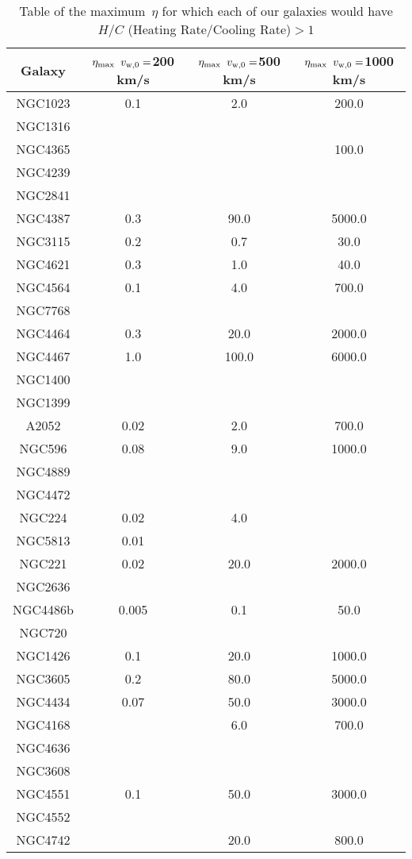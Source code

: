 \begin{table}
\caption{\label{tab:eta} Table of the maximum\
 $\eta$ for which each of our galaxies would have $H/C$ (Heating Rate/Cooling Rate)$>1$}
\begin{tabular}{cccc}
\hline
Galaxy & $\eta_{\rm max}$ $v_{\rm w,0}=$200 km/s & $\eta_{\rm max}$ $v_{\rm w,0}=$500 km/s & $\eta_{\rm max}$ $v_{\rm w,0}=$1000 km/s \\
\hline
NGC1023 & 0.1 & 2.0 & 200.0 \\
NGC1316 &  &  &  \\
NGC4365 &  &  & 100.0 \\
NGC4239 &  &  &  \\
NGC2841 &  &  &  \\
NGC4387 & 0.3 & 90.0 & 5000.0 \\
NGC3115 & 0.2 & 0.7 & 30.0 \\
NGC4621 & 0.3 & 1.0 & 40.0 \\
NGC4564 & 0.1 & 4.0 & 700.0 \\
NGC7768 &  &  &  \\
NGC4464 & 0.3 & 20.0 & 2000.0 \\
NGC4467 & 1.0 & 100.0 & 6000.0 \\
NGC1400 &  &  &  \\
NGC1399 &  &  &  \\
A2052 & 0.02 & 2.0 & 700.0 \\
NGC596 & 0.08 & 9.0 & 1000.0 \\
NGC4889 &  &  &  \\
NGC4472 &  &  &  \\
NGC224 & 0.02 & 4.0 &  \\
NGC5813 & 0.01 &  &  \\
NGC221 & 0.02 & 20.0 & 2000.0 \\
NGC2636 &  &  &  \\
NGC4486b & 0.005 & 0.1 & 50.0 \\
NGC720 &  &  &  \\
NGC1426 & 0.1 & 20.0 & 1000.0 \\
NGC3605 & 0.2 & 80.0 & 5000.0 \\
NGC4434 & 0.07 & 50.0 & 3000.0 \\
NGC4168 &  & 6.0 & 700.0 \\
NGC4636 &  &  &  \\
NGC3608 &  &  &  \\
NGC4551 & 0.1 & 50.0 & 3000.0 \\
NGC4552 &  &  &  \\
NGC4742 &  & 20.0 & 800.0 \\

\end{tabular}
\end{table}
